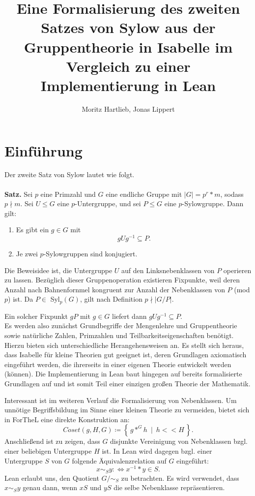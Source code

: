 \documentclass[a4paper,12pt]{scrartcl}
\title{Eine Formalisierung des zweiten Satzes von Sylow aus der Gruppentheorie in Isabelle im Vergleich zu einer Implementierung in Lean}
\author{Moritz Hartlieb, Jonas Lippert}
\newcommand{\st}{\ \mid\ }
\begin{document}
\maketitle
\newpage

\newpage
{}

\section{Einführung}

Der zweite Satz von Sylow lautet wie folgt.\\\\
\textbf{Satz.}
	Sei $p$ eine Primzahl und $G$ eine endliche Gruppe mit $|G|=p^{r}*m$, sodass $p\nmid m$. Sei $U \leq G$ eine $p$-Untergruppe, und sei $P \leq G$ eine $p$-Sylowgruppe. Dann gilt:
	\begin{enumerate}
		\item Es gibt ein $g\in G$ mit $$gUg^{-1}\subseteq P.$$
		\item Je zwei $p$-Sylowgruppen sind konjugiert.
	\end{enumerate}
Die Beweisidee ist, die Untergruppe $U$ auf den Linksnebenklassen von $P$ operieren zu lassen. Bezüglich dieser Gruppenoperation existieren Fixpunkte, weil deren Anzahl nach Bahnenfornmel kongruent zur Anzahl der Nebenklassen von $P$ (mod $p$) ist. Da $P\in$ Syl$_{p}(G)$, gilt nach Definition $p\nmid |G/P|$.

Ein solcher Fixpunkt $gP$ mit $g\in G$ liefert dann $gUg^{-1}\subseteq P.$
\\

Es werden also zunächst Grundbegriffe der Mengenlehre und Gruppentheorie sowie natürliche Zahlen, Primzahlen und Teilbarkeitseigenschaften benötigt. Hierzu bieten sich unterschiedliche Herangehensweisen an. 
Es stellt sich heraus, dass Isabelle für kleine Theorien gut geeignet ist, deren Grundlagen axiomatisch eingeführt werden, die ihrerseits in einer eigenen Theorie entwickelt werden (können). Die Implementierung in Lean baut hingegen auf bereits formalisierte Grundlagen auf und ist somit Teil einer einzigen großen Theorie der Mathematik. 

Interessant ist im weiteren Verlauf die Formalisierung von Nebenklassen. Um unnötige Begriffsbildung im Sinne einer kleinen Theorie zu vermeiden, bietet sich in ForTheL eine direkte Konstruktion an: $$Coset\left(g, H, G\right) \coloneqq \left\{\,g *^{G} h \st h << H\,\right\}.$$ Anschließend ist zu zeigen, dass $G$ disjunkte Vereinigung von Nebenklassen bzgl. einer beliebigen Untergruppe $H$ ist.
In Lean wird dagegen bzgl. einer Untergruppe $S$ von $G$ folgende Äquivalenzrelation auf $G$ eingeführt: $$x\sim_{S} y :\Leftrightarrow x^{-1}*y\in S.$$
Lean erlaubt uns, den Quotient $G/\sim_{S}$ zu betrachten. Es wird verwendet, dass $x\sim_{S} y$ genau dann, wenn $xS$ und $yS$ die selbe Nebenklasse repräsentieren. \\
\end{document}
